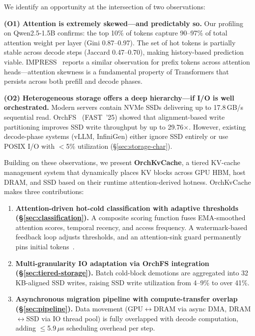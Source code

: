 \documentclass[conference]{IEEEtran}
\begin{document}
We identify an opportunity at the intersection of two observations:

\textbf{(O1) Attention is extremely skewed---and predictably so.} Our profiling on Qwen2.5-1.5B confirms: the top 10\% of tokens capture 90--97\% of total attention weight per layer (Gini 0.87--0.97). The set of hot tokens is partially stable across decode steps (Jaccard 0.47--0.70), making history-based prediction viable. IMPRESS~\cite{impress} reports a similar observation for prefix tokens across attention heads---attention skewness is a fundamental property of Transformers that persists across both prefill and decode phases.

\textbf{(O2) Heterogeneous storage offers a deep hierarchy---if I/O is well orchestrated.} Modern servers contain NVMe SSDs delivering up to 17.8\,GB/s sequential read. OrchFS~\cite{orchfs} (FAST~'25) showed that alignment-based write partitioning improves SSD write throughput by up to 29.76$\times$. However, existing decode-phase systems (vLLM, InfiniGen) either ignore SSD entirely or use POSIX I/O with $<$5\% utilization (\S\ref{sec:storage-char}).

Building on these observations, we present \textbf{OrchKvCache}, a tiered KV-cache management system that dynamically places KV blocks across GPU HBM, host DRAM, and SSD based on their runtime attention-derived hotness. OrchKvCache makes three contributions:

\begin{enumerate}
\item \textbf{Attention-driven hot-cold classification with adaptive thresholds (\S\ref{sec:classification}).} A composite scoring function fuses EMA-smoothed attention scores, temporal recency, and access frequency. A watermark-based feedback loop adjusts thresholds, and an attention-sink guard permanently pins initial tokens~\cite{streamingllm}.

\item \textbf{Multi-granularity IO adaptation via OrchFS integration (\S\ref{sec:tiered-storage}).} Batch cold-block demotions are aggregated into 32\,KB-aligned SSD writes, raising SSD write utilization from 4--9\% to over 41\%.

\item \textbf{Asynchronous migration pipeline with compute-transfer overlap (\S\ref{sec:pipeline}).} Data movement (GPU$\leftrightarrow$DRAM via async DMA, DRAM$\leftrightarrow$SSD via IO thread pool) is fully overlapped with decode computation, adding $\leq$5.9\,$\mu$s scheduling overhead per step.
\end{enumerate}
\end{document}

